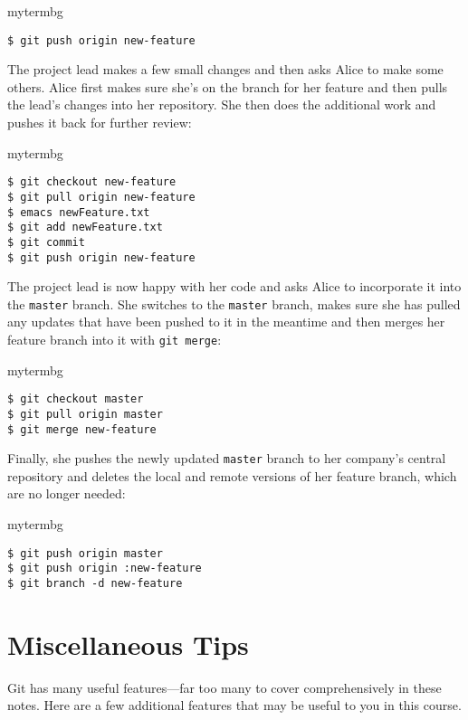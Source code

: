 \begin{tsession}{mytermbg}
\begin{verbatim}
$ git push origin new-feature
\end{verbatim}
\end{tsession}

The project lead makes a few small changes and then asks Alice to make some
others.  Alice first makes sure she's on the branch for her feature and then
pulls the lead's changes into her repository.  She then does the additional
work and pushes it back for further review:

\begin{tsession}{mytermbg}
\begin{verbatim}
$ git checkout new-feature
$ git pull origin new-feature
$ emacs newFeature.txt
$ git add newFeature.txt
$ git commit
$ git push origin new-feature
\end{verbatim}
\end{tsession}

The project lead is now happy with her code and asks Alice to incorporate it
into the \texttt{master} branch.  She switches to the \texttt{master} branch,
makes sure she has pulled any updates that have been pushed to it in the
meantime and then merges her feature branch into it with \texttt{git merge}:

\begin{tsession}{mytermbg}
\begin{verbatim}
$ git checkout master
$ git pull origin master
$ git merge new-feature
\end{verbatim}
\end{tsession}

Finally, she pushes the newly updated \texttt{master} branch to her company's
central repository and deletes the local and remote versions of her feature
branch, which are no longer needed:

\begin{tsession}{mytermbg}
\begin{verbatim}
$ git push origin master
$ git push origin :new-feature
$ git branch -d new-feature
\end{verbatim}
\end{tsession}

\section{Miscellaneous Tips}

Git has many useful features---far too many to cover comprehensively in these
notes.  Here are a few additional features that may be useful to you in this
course.


